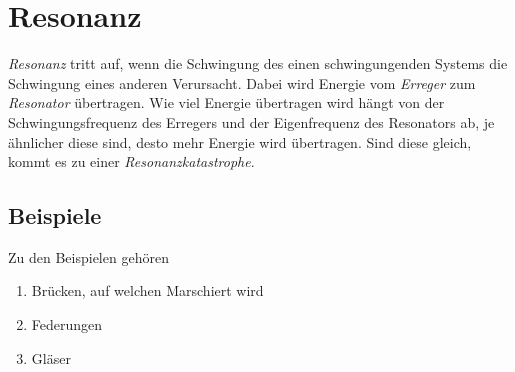 \documentclass{article}
\begin{document}
\section{Resonanz}
\emph{Resonanz} tritt auf, wenn die Schwingung des einen schwingungenden Systems die Schwingung eines anderen Verursacht. Dabei wird Energie vom \emph{Erreger} zum \emph{Resonator} übertragen. Wie viel Energie übertragen wird hängt von der Schwingungsfrequenz des Erregers und der Eigenfrequenz des Resonators ab, je ähnlicher diese sind, desto mehr Energie wird übertragen. Sind diese gleich, kommt es zu einer \emph{Resonanzkatastrophe}.
 
\subsection{Beispiele}
Zu den Beispielen gehören
\begin{enumerate}
 \item Brücken, auf welchen Marschiert wird 
 \item Federungen
 \item Gläser 
\end{enumerate} 
\end{document}

